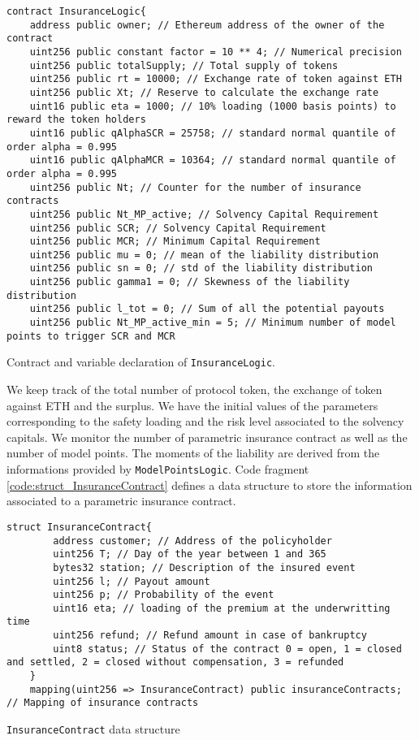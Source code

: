 \documentclass[10pt]{article}
\begin{document}
\begin{codefragment}[!h]
\begin{lstlisting}[language=Solidity]
contract InsuranceLogic{
    address public owner; // Ethereum address of the owner of the contract
    uint256 public constant factor = 10 ** 4; // Numerical precision
    uint256 public totalSupply; // Total supply of tokens
    uint256 public rt = 10000; // Exchange rate of token against ETH
    uint256 public Xt; // Reserve to calculate the exchange rate
    uint16 public eta = 1000; // 10% loading (1000 basis points) to reward the token holders
    uint16 public qAlphaSCR = 25758; // standard normal quantile of order alpha = 0.995
    uint16 public qAlphaMCR = 10364; // standard normal quantile of order alpha = 0.995
    uint256 public Nt; // Counter for the number of insurance contracts
    uint256 public Nt_MP_active; // Solvency Capital Requirement
    uint256 public SCR; // Solvency Capital Requirement
    uint256 public MCR; // Minimum Capital Requirement
    uint256 public mu = 0; // mean of the liability distribution
    uint256 public sn = 0; // std of the liability distribution
    uint256 public gamma1 = 0; // Skewness of the liability distribution
    uint256 public l_tot = 0; // Sum of all the potential payouts
    uint256 public Nt_MP_active_min = 5; // Minimum number of model points to trigger SCR and MCR
    \end{lstlisting}
    \caption{Contract and variable declaration of \texttt{InsuranceLogic}.}
    \label{code:declaration_InsuranceLogic}
\end{codefragment}

We keep track of the total number of protocol token, the exchange of token against ETH and the surplus. We have the initial values of the parameters corresponding to the safety loading and the risk level associated to the solvency capitals. We monitor the number of parametric insurance contract as well as the number of model points. The moments of the liability are derived from the informations provided by \texttt{ModelPointsLogic}. Code fragment \ref{code:struct_InsuranceContract} defines a data structure to store the information associated to a parametric insurance contract.  

\begin{codefragment}[!h]
\begin{lstlisting}[language=Solidity]
 struct InsuranceContract{
        address customer; // Address of the policyholder
        uint256 T; // Day of the year between 1 and 365
        bytes32 station; // Description of the insured event
        uint256 l; // Payout amount
        uint256 p; // Probability of the event
        uint16 eta; // loading of the premium at the underwritting time
        uint256 refund; // Refund amount in case of bankruptcy
        uint8 status; // Status of the contract 0 = open, 1 = closed and settled, 2 = closed without compensation, 3 = refunded
    }
    mapping(uint256 => InsuranceContract) public insuranceContracts; // Mapping of insurance contracts

\end{lstlisting}
    \caption{\texttt{InsuranceContract} data structure}
    \label{code:struct_InsuranceContract}
\end{codefragment}
\end{document}
